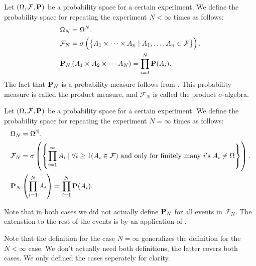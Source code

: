 \documentclass[11pt,a4paper]{article}
\begin{document}
\begin{definition}
  Let $(\Omega, \mathcal F, \mathbf{P})$ be a probability space for a certain
  experiment.
  We define the probability space for repeating the experiment $N < \infty$
  times as follows:
  \begin{align*}
    &\Omega_N = \Omega^N. \\
    &\mathcal F_N =
    \sigma\del{\set{A_1 \times \cdots \times A_n \mid 
    A_1,\dots,A_n \in \mathcal F}}. \\
    &\Prob_N\left(A_1 \times A_2 \times \cdots A_N\right) = 
    \prod_{i=1}^{N} \Prob(A_i).
  \end{align*}
  The fact that $\mathbf{P}_N$ is a probability measure follows from
  . 
  This probability measure is called the product measure,
  and $\mathcal F_N$ is called the product $\sigma$-algebra.
\end{definition}

\begin{definition}
  Let $(\Omega, \mathcal F, \mathbf{P})$ be a probability space for a certain
  experiment.
  We define the probability space for repeating the experiment $N = \infty$
  times as follows:
  \begin{align*}
    &\Omega_N = \Omega^{\mathbb{N}}. \\
    &\mathcal F_N = \sigma\left(\left\{\prod_{i=1}^{\infty}{A_i} \mid
    \forall i \geq 1(A_i \in \mathcal F)  \text{ and } \text{only for finitely many
    $i$'s } A_i \neq \Omega\right\}\right). \\
    &\mathbf{P}_N\left(\prod_{i=1}^{N}{A_i}\right) = 
    \prod_{i=1}^{N} \mathbf{P}(A_i).
  \end{align*}
\end{definition}

\begin{remark}
  Note that in both cases we did not actually define $\mathbf{P}_N$ for all
  events in $\mathcal F_N$.
  The extenstion to the rest of the events is by an application
  of .
\end{remark}

\begin{remark}
  Note that the definition for the case $N = \infty$ generalizes
  the definition for the $N < \infty$ case.
  We don't actually need both definitions,
  the latter covers both cases.
  We only defined the cases seperately for clarity.
\end{remark}
\end{document}
